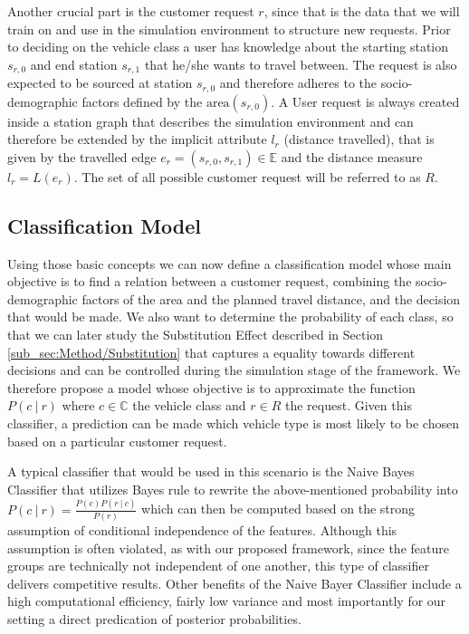 Another crucial part is the customer request $r$, since that is the data that we will train on and use in the simulation
environment to structure new requests. Prior to deciding on the vehicle class a user has knowledge about
the starting station $s_{r, 0}$ and end station $s_{r, 1}$ that he/she wants to travel between. The request is also expected
to be sourced at station $s_{r, 0}$ and therefore adheres to the socio-demographic factors defined by the $\text{area}(s_{r, 0})$.
A User request is always created inside a station graph that describes the simulation environment and can therefore
be extended by the implicit attribute $l_r$ (distance travelled), that is given by the travelled edge $e_r = (s_{r, 0}, s_{r, 1}) \in \mathbb{E}$
and the distance measure $l_r = L(e_r)$. The set of all possible customer request will be referred to as $R$.

\subsection{Classification Model}
\label{sub_sec:Method/Class}

Using those basic concepts we can now define a classification model whose
main objective is to find a relation between a customer request, combining the socio-demographic factors of the area
and the planned travel distance, and the decision that would be made. We also want to determine the
probability of each class, so that we can later study the Substitution Effect described in Section \ref{sub_sec:Method/Substitution}
that captures a equality towards different decisions and can be controlled during the
simulation stage of the framework. We therefore propose a model whose objective is to
approximate the function $P(c \ | \ r)$ where $c \in \mathbb{C}$ the vehicle class and  $r \in R$ the request.
Given this classifier, a prediction can be made which vehicle type is most likely to be chosen based
on a particular customer request.

A typical classifier that would be used in this scenario is the Naive Bayes Classifier that utilizes
Bayes rule to rewrite the above-mentioned probability into $P(c \ | \ r) = \frac{P(c)P(r \ | \ c)}{P(r)}$
which can then be computed based on the strong assumption of conditional independence of the features.
Although this assumption is often violated, as with our proposed framework, since the feature groups
are technically not independent of one another, this type of classifier delivers competitive results.
Other benefits of the Naive Bayer Classifier include a high computational efficiency, fairly low variance
and most importantly for our setting a direct predication of posterior probabilities. \cite{Webb2010}

